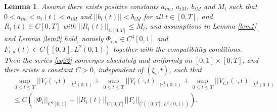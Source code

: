 \documentclass[preprint,12pt,authoryear]{elsarticle}
\newtheorem{lemma}{Lemma}
\begin{document}
\begin{lemma}\label{lem3}
    Assume there exists positive constants $a_{im}$, $a_{iM}$, $b_{iM}$ and $M_{i}$ such that $0<a_{im}<a_i(t)<a_{iM}$ and $||b_i(t)||<b_{iM}$ for all $t\in[0,T]$, and $R_i(t)\in C[0,T]$ with $||R_i(t)||_{C[0,T]}\leq M_{i}$, and assumptions in Lemma \ref{lem1} and Lemma \ref{lem2} hold, namely $\Phi_{i,n}\in C^4[0,1]$ and $F_{i,n}(t)\in C([0,T]; L^2(0,1))$ together with the compatibility conditions. Then the series \eqref{eq22} converges absolutely and uniformly on $[0,1]\times[0,T]$, and there exists a constant $C>0$, independent of $(\xi_i,t)$, such that
    \begin{equation}\label{uniform}
        \begin{split}
            &\sup\limits_{0\leq t\leq T}||V_{i}(\cdot,t)||_{L^2(0,1)}+\sup\limits_{0\leq t\leq T}||V_i(\cdot,t)||_{\mathbb{H}_0^1(0,1)}+\sup\limits_{0\leq t\leq T}||V_{i,t}(\cdot,t)||_{L^2(0,1)}\\
            &\leq C\left(||\Phi_{i}||_{C^4[0,1]}+||R_i(t)||_{C[0,T]}||F_i||_{C([0,T];L^2(0,1))}\right).
        \end{split}
    \end{equation}
\end{lemma}
\end{document}
